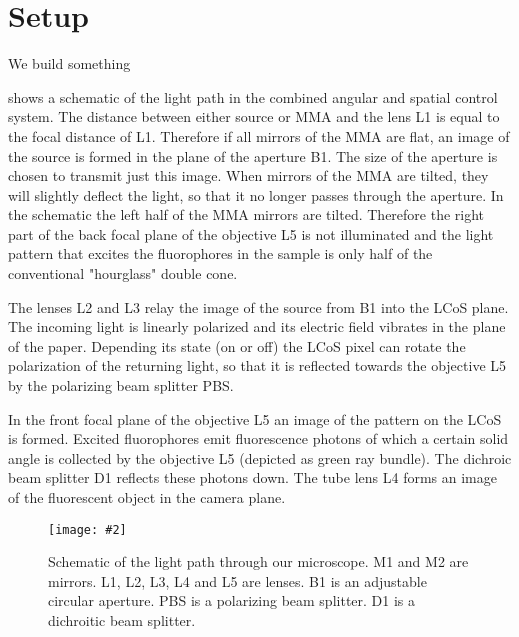 
\chapter{Setup}
\begin{summary}
  We build something
\end{summary}



\newcommand{\imagw}[3]{
  \begin{figure}[!hbt]
    \centering
    \texttt{[image: \#2]}
    \caption{#3}
    \label{fig:#2}
  \end{figure}
}

\newcommand{\imag}[2]{\imagw{16cm}{#1}{#2}}

 shows a schematic of the light path in
the combined angular and spatial control system. The distance between
either source or MMA and the lens L1 is equal to the focal distance of
L1. Therefore if all mirrors of the MMA are flat, an image of the
source is formed in the plane of the aperture B1. The size of the
aperture is chosen to transmit just this image. When mirrors of the
MMA are tilted, they will slightly deflect the light, so that it no
longer passes through the aperture.  In the schematic the left half of
the MMA mirrors are tilted. Therefore the right part of the back focal
plane of the objective L5 is not illuminated and the light pattern
that excites the fluorophores in the sample is only half of the
conventional "hourglass" double cone.

The lenses L2 and L3 relay the image of the source from B1 into the
LCoS plane.  The incoming light is linearly polarized and its electric
field vibrates in the plane of the paper. Depending its state (on or
off) the LCoS pixel can rotate the polarization of the returning
light, so that it is reflected towards the objective L5 by the
polarizing beam splitter PBS.


In the front focal plane of the objective L5 an image of the pattern
on the LCoS is formed. Excited fluorophores emit fluorescence photons
of which a certain solid angle is collected by the objective L5
(depicted as green ray bundle). The dichroic beam splitter D1 reflects
these photons down. The tube lens L4 forms an image of the fluorescent
object in the camera plane.


\imag{setup-gimp}{Schematic of the light path through our
  microscope. M1 and M2 are mirrors.  L1, L2, L3, L4 and L5 are
  lenses. B1 is an adjustable circular aperture. PBS is a polarizing
  beam splitter. D1 is a dichroitic beam splitter.}


